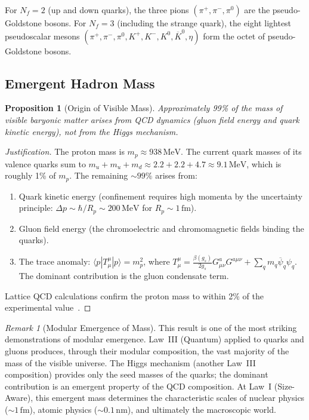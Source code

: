 \documentclass[12pt]{article}
\newtheorem{proposition}[theorem]{Proposition}
\theoremstyle{definition}
\theoremstyle{remark}
\newtheorem{remark}[theorem]{Remark}
\newcommand{\psibar}{\overline{\psi}}
\newcommand{\MeV}{\,\mathrm{MeV}}
\begin{document}
For $N_f = 2$ (up and down quarks), the three pions $(\pi^+, \pi^-, \pi^0)$ are the pseudo-Goldstone bosons. For $N_f = 3$ (including the strange quark), the eight lightest pseudoscalar mesons $(\pi^+, \pi^-, \pi^0, K^+, K^-, K^0, \overline{K}^0, \eta)$ form the octet of pseudo-Goldstone bosons.

\subsection{Emergent Hadron Mass}

\begin{proposition}[Origin of Visible Mass]
\label{prop:hadronmass}
Approximately 99\% of the mass of visible baryonic matter arises from QCD dynamics (gluon field energy and quark kinetic energy), not from the Higgs mechanism.
\end{proposition}

\begin{proof}[Justification]
The proton mass is $m_p \approx 938\MeV$. The current quark masses of its valence quarks sum to $m_u + m_u + m_d \approx 2.2 + 2.2 + 4.7 \approx 9.1\MeV$, which is roughly 1\% of $m_p$. The remaining $\sim 99\%$ arises from:
\begin{enumerate}
    \item Quark kinetic energy (confinement requires high momenta by the uncertainty principle: $\Delta p \sim \hbar / R_p \sim 200\MeV$ for $R_p \sim 1\,\mathrm{fm}$).
    \item Gluon field energy (the chromoelectric and chromomagnetic fields binding the quarks).
    \item The trace anomaly: $\langle p | T^\mu_\mu | p \rangle = m_p^2$, where $T^\mu_\mu = \frac{\beta(g_s)}{2g_s} G^a_{\mu\nu}G^{a\mu\nu} + \sum_q m_q \psibar_q \psi_q$. The dominant contribution is the gluon condensate term.
\end{enumerate}
Lattice QCD calculations confirm the proton mass to within 2\% of the experimental value~\cite{BMW2008}.
\end{proof}

\begin{remark}[Modular Emergence of Mass]
\label{rem:emergentmass}
This result is one of the most striking demonstrations of modular emergence. Law~III (Quantum) applied to quarks and gluons produces, through their modular composition, the vast majority of the mass of the visible universe. The Higgs mechanism (another Law~III composition) provides only the seed masses of the quarks; the dominant contribution is an emergent property of the QCD composition. At Law~I (Size-Aware), this emergent mass determines the characteristic scales of nuclear physics ($\sim 1\,\mathrm{fm}$), atomic physics ($\sim 0.1\,\mathrm{nm}$), and ultimately the macroscopic world.
\end{remark}
\end{document}
